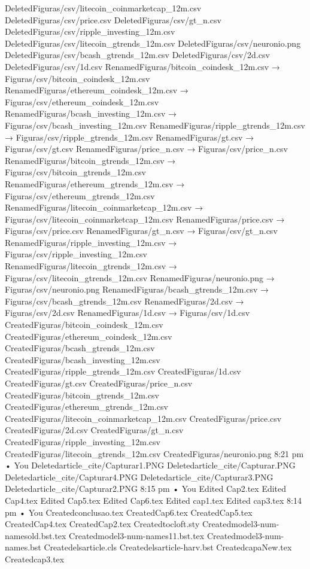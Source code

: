 DeletedFiguras/csv/litecoin_coinmarketcap_12m.csv
DeletedFiguras/csv/price.csv
DeletedFiguras/csv/gt_n.csv
DeletedFiguras/csv/ripple_investing_12m.csv
DeletedFiguras/csv/litecoin_gtrends_12m.csv
DeletedFiguras/csv/neuronio.png
DeletedFiguras/csv/bcash_gtrends_12m.csv
DeletedFiguras/csv/2d.csv
DeletedFiguras/csv/1d.csv
RenamedFiguras/bitcoin_coindesk_12m.csv → Figuras/csv/bitcoin_coindesk_12m.csv
RenamedFiguras/ethereum_coindesk_12m.csv → Figuras/csv/ethereum_coindesk_12m.csv
RenamedFiguras/bcash_investing_12m.csv → Figuras/csv/bcash_investing_12m.csv
RenamedFiguras/ripple_gtrends_12m.csv → Figuras/csv/ripple_gtrends_12m.csv
RenamedFiguras/gt.csv → Figuras/csv/gt.csv
RenamedFiguras/price_n.csv → Figuras/csv/price_n.csv
RenamedFiguras/bitcoin_gtrends_12m.csv → Figuras/csv/bitcoin_gtrends_12m.csv
RenamedFiguras/ethereum_gtrends_12m.csv → Figuras/csv/ethereum_gtrends_12m.csv
RenamedFiguras/litecoin_coinmarketcap_12m.csv → Figuras/csv/litecoin_coinmarketcap_12m.csv
RenamedFiguras/price.csv → Figuras/csv/price.csv
RenamedFiguras/gt_n.csv → Figuras/csv/gt_n.csv
RenamedFiguras/ripple_investing_12m.csv → Figuras/csv/ripple_investing_12m.csv
RenamedFiguras/litecoin_gtrends_12m.csv → Figuras/csv/litecoin_gtrends_12m.csv
RenamedFiguras/neuronio.png → Figuras/csv/neuronio.png
RenamedFiguras/bcash_gtrends_12m.csv → Figuras/csv/bcash_gtrends_12m.csv
RenamedFiguras/2d.csv → Figuras/csv/2d.csv
RenamedFiguras/1d.csv → Figuras/csv/1d.csv
CreatedFiguras/bitcoin_coindesk_12m.csv
CreatedFiguras/ethereum_coindesk_12m.csv
CreatedFiguras/bcash_gtrends_12m.csv
CreatedFiguras/bcash_investing_12m.csv
CreatedFiguras/ripple_gtrends_12m.csv
CreatedFiguras/1d.csv
CreatedFiguras/gt.csv
CreatedFiguras/price_n.csv
CreatedFiguras/bitcoin_gtrends_12m.csv
CreatedFiguras/ethereum_gtrends_12m.csv
CreatedFiguras/litecoin_coinmarketcap_12m.csv
CreatedFiguras/price.csv
CreatedFiguras/2d.csv
CreatedFiguras/gt_n.csv
CreatedFiguras/ripple_investing_12m.csv
CreatedFiguras/litecoin_gtrends_12m.csv
CreatedFiguras/neuronio.png
8:21 pm • You
Deletedarticle_cite/Capturar1.PNG
Deletedarticle_cite/Capturar.PNG
Deletedarticle_cite/Capturar4.PNG
Deletedarticle_cite/Capturar3.PNG
Deletedarticle_cite/Capturar2.PNG
8:15 pm • You
Edited Cap2.tex
Edited Cap4.tex
Edited Cap5.tex
Edited Cap6.tex
Edited cap1.tex
Edited cap3.tex
8:14 pm • You
Createdconclusao.tex
CreatedCap6.tex
CreatedCap5.tex
CreatedCap4.tex
CreatedCap2.tex
Createdtocloft.sty
Createdmodel3-num-namesold.bst.tex
Createdmodel3-num-names11.bst.tex
Createdmodel3-num-names.bst
Createdelsarticle.cls
Createdelsarticle-harv.bst
CreatedcapaNew.tex
Createdcap3.tex
